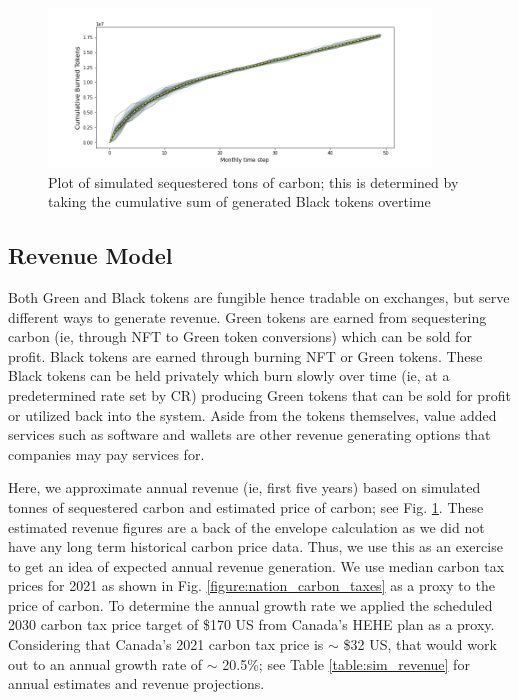 \documentclass{article}
\begin{document}
\begin{figure}
\centering
\includegraphics[width=4in]{burned_tokens.png}
\caption{Plot of simulated sequestered tons of carbon; this is determined by taking the cumulative sum of generated Black tokens overtime } 
\label{fig:burned_tokens}
\end{figure} 

\subsection{Revenue Model}

Both Green and Black tokens are fungible hence tradable on exchanges, but serve different ways to generate revenue. Green tokens are earned from sequestering carbon (ie, through NFT to Green token conversions) which can be sold for profit. Black tokens are earned through burning NFT or Green tokens. These Black tokens can be held privately which burn slowly over time (ie, at a predetermined rate set by CR) producing Green tokens that can be sold for profit or utilized back into the system. Aside from the tokens themselves, value added services such as software and wallets are other revenue generating options that companies may pay services for. 

Here, we approximate annual revenue (ie, first five years) based on simulated tonnes of sequestered carbon and estimated price of carbon; see Fig. \ref{fig:burned_tokens}. These estimated revenue figures are a back of the envelope calculation as we did not have any long term historical carbon price data. Thus, we use this as an exercise to get an idea of expected annual revenue generation. We use median carbon tax prices for 2021 as shown in Fig. \ref{figure:nation_carbon_taxes} as a proxy to the price of carbon. To determine the annual growth rate we applied the scheduled 2030 carbon tax price target of \$170 US from Canada's HEHE plan as a proxy. Considering that Canada's 2021 carbon tax price is $\sim$ \$32 US, that would work out to an annual growth rate of $\sim$ 20.5\%; see Table \ref{table:sim_revenue} for annual estimates and revenue projections.
\end{document}
